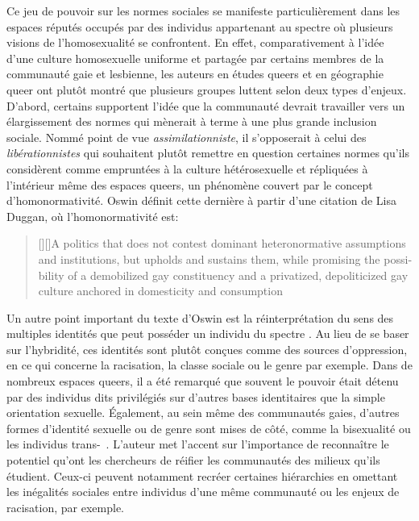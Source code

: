 Ce jeu de pouvoir sur les normes sociales se manifeste particulièrement dans les espaces réputés occupés par des individus appartenant au spectre \lgbt{} où plusieurs visions de l'homosexualité se confrontent.
En effet, comparativement à l'idée d'une culture homosexuelle uniforme et partagée par certains membres de la communauté gaie et lesbienne, les auteurs en études queers et en géographie queer ont plutôt montré que plusieurs groupes luttent selon deux types d'enjeux.
D'abord, certains supportent l'idée que la communauté devrait travailler vers un élargissement des normes qui mènerait à terme à une plus grande inclusion sociale.
Nommé point de vue \emph{assimilationniste}, il s'opposerait à celui des \emph{libérationnistes} qui souhaitent plutôt remettre en question certaines normes qu'ils considèrent comme empruntées à la culture hétérosexuelle et répliquées à l'intérieur même des espaces queers, un phénomène couvert par le concept d'homonormativité.
Oswin définit cette dernière à partir d'une citation de Lisa Duggan, où l'homonormativité est:
\foreignblockquote{english}[{\cite[tel que cité dans][92]{Oswin2008}}][]{[{\cite[50]{Duggan2003}}][]{A politics that does not contest dominant heteronormative assumptions and institutions, but upholds and sustains them, while promising the possibility of a demobilized gay constituency and a privatized, depoliticized gay culture anchored in domesticity and consumption}}.

Un autre point important du texte d'Oswin est la réinterprétation du sens des multiples identités que peut posséder un individu du spectre \lgbt{}.
Au lieu de se baser sur l'hybridité, ces identités sont plutôt conçues comme des sources d'oppression, en ce qui concerne la racisation, la classe sociale ou le genre par exemple.
Dans de nombreux espaces queers, il a été remarqué que souvent le pouvoir était détenu par des individus dits privilégiés sur d'autres bases identitaires que la simple orientation sexuelle.
Également, au sein même des communautés gaies, d'autres formes d'identité sexuelle ou de genre sont mises de côté, comme la bisexualité ou les individus trans-~\citep[93]{Oswin2008}.
L'auteur met l'accent sur l'importance de reconnaître le potentiel qu'ont les chercheurs de réifier les communautés des milieux qu'ils étudient. Ceux-ci peuvent notamment recréer certaines hiérarchies en omettant les inégalités sociales entre individus d'une même communauté ou les enjeux de racisation, par exemple.

